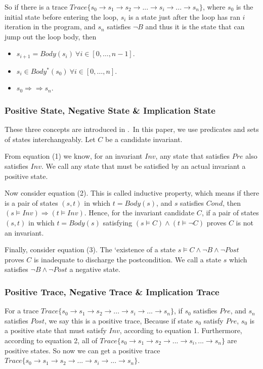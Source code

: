 So if there is a trace $Trace\{s_0 \to s_1 \to s_2 \to ...\to s_i \to ... \to s_n\}$, 
where $s_0$ is the initial state before entering the loop, 
$s_i$ is a state just after the loop has ran $i$ iteration in the program,
and $s_n$ satisfies $\neg B$ and thus it is the state that can jump out the loop body,
then 
\begin{itemize}
\item $s_{i+1} = Body(s_i)\ \forall i \in [0, \ldots, n-1]$.
\item $s_{i} \in Body^*(s_0)\ \forall i \in [0, \ldots, n]$.
\item $s_{0} \Rightarrow\Rightarrow s_{n}$.
\end{itemize}



\subsubsection*{Positive State, Negative State \& Implication State}
These three concepts are introduced in \cite{sharma2014invariant}.\
In this paper, we use predicates and sets of states interchangeably.
Let $C$ be a candidate invariant.

From equation (1) we know, for an invariant $Inv$, 
any state that satisfies $Pre$ also satisfies $Inv$. 
We call any state that must be satisfied by an actual invariant a positive state. 


Now consider equation (2).
This is called inductive property, which means if there is a pair of states $(s, t)$ in which $t = Body(s)$, 
and $s$ satisfies $Cond$, then $(s \models Inv) \Rightarrow (t \models {Inv})$. 
Hence, for the invariant candidate $C$, 
if a pair of states $(s, t)$ in which $t = Body(s)$ satisfying $(s \models C) \land (t \models \neg C)$ proves $C$ is not an invariant. 

Finally, consider equation (3).
The `existence of a state $s \models C \wedge \neg B \wedge \neg Post$ proves $C$ is inadequate to discharge the postcondition. 
We call a state $s$ which satisfies $\neg{B} \land \neg{Post}$ a negative state. 



\subsubsection*{Positive Trace, Negative Trace \& Implication Trace}
For a trace $Trace\{s_0 \to s_1 \to s_2 \to ... \to s_i \to ... \to s_n\}$, 
if $s_0$ satisfies $Pre$, and $s_n$ satisfies $Post$,
we say this is a positive trace,
Because if state $s_0$ satisfy $Pre$,
$s_0$ is a positive state that must satisfy $Inv$, according to equation 1.
Furthermore, according to equation 2,
all of $Trace\{s_0 \to s_1 \to s_2 \to ...\to s_i, ... \to s_n\}$ are positive states.
So now we can get a positive trace  $Trace\{s_0 \to s_1 \to s_2 \to ...\to s_i \to ... \to s_n\}$.

